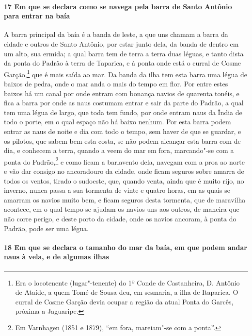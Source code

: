 \paragraph{17 Em que se declara como se navega pela barra de Santo Antônio para entrar na
baía} A barra principal da baía é a banda de leste, a que uns chamam a barra da cidade e
outros de Santo Antônio, por estar junto dela, da banda de dentro em um alto, sua ermida;
a qual barra tem de terra a terra duas léguas, e tanto dista da ponta do Padrão à terra de
Taparica, e à ponta onde está o curral de Cosme Garção,\footnote{ Era o locotenente
(lugar"-tenente) do 1º Conde de Castanheira, D. Antônio de Ataíde, a quem Tomé de Sousa
deu, em sesmaria, a ilha de Itaparica. O curral de Cosme Garção devia ocupar a região da
atual Ponta do Garcês, próxima a Jaguaripe.} que é mais saída ao mar. Da banda da ilha tem
esta barra uma légua de baixos de pedra, onde o mar anda o mais do tempo em flor. Por
entre estes baixos há um canal por onde entram com bonança navios de quarenta tonéis, e
fica a barra por onde as naus costumam entrar e sair da parte do Padrão, a qual tem uma
légua de largo, que toda tem fundo, por onde entram naus da Índia de todo o porte, em o
qual espaço não há baixo nenhum. Por esta barra podem entrar as naus de noite e dia com
todo o tempo, sem haver de que se guardar, e os pilotos, que sabem bem esta costa, se não
podem alcançar esta barra com de dia, e conhecem a terra, quando a veem do mar em fora,
marcando"-se com a ponta do Padrão,\footnote{ Em Varnhagen (1851 e 1879), ``em fora,
mareiam"-se com a ponta''.} e como ficam a barlavento dela, navegam com a proa ao norte e
vão dar consigo no ancoradouro da cidade, onde ficam seguros sobre amarra de todos os
ventos, tirado o sudoeste, que, quando venta, ainda que é muito rijo, no inverno,
nunca passa a sua tormenta de vinte e quatro horas, em as quais se
amarram os navios muito bem, e ficam seguros desta tormenta, que de maravilha acontece, em
o qual tempo se ajudam os navios uns aos outros, de maneira que não corre perigo, e deste
porto da cidade, onde os navios ancoram, à ponta do Padrão, pode ser uma légua.

\paragraph{18 Em que se declara o tamanho do mar da baía, em que podem andar naus à vela,
e de algumas ilhas}

